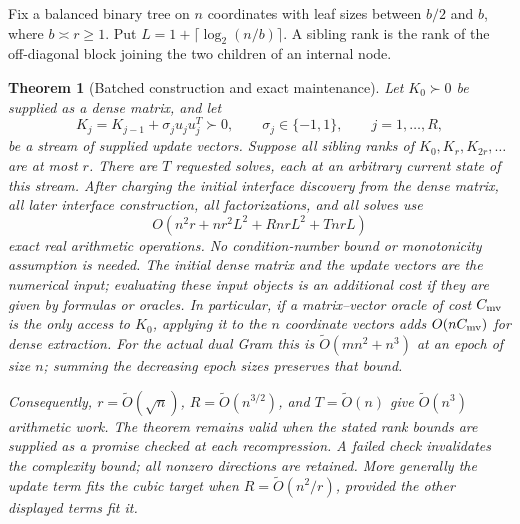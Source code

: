 \documentclass[11pt]{amsart}
\newtheorem{theorem}{Theorem}[section]
\theoremstyle{definition}\newtheorem{definition}[theorem]{Definition}
\theoremstyle{remark}\newtheorem{remark}[theorem]{Remark}
\numberwithin{equation}{section}
\begin{document}
Fix a balanced binary tree on $n$ coordinates with leaf sizes between
$b/2$ and $b$, where $b\asymp r\ge1$.  Put
$L=1+\lceil\log_2(n/b)\rceil$.  A sibling rank is the rank of the
off-diagonal block joining the two children of an internal node.

\begin{theorem}[Batched construction and exact maintenance]
\label{ifc:dyn:thm}
Let $K_0\succ0$ be supplied as a dense matrix, and let
\[
 K_j=K_{j-1}+\sigma_j u_ju_j^T\succ0,
 \qquad \sigma_j\in\{-1,1\},\qquad j=1,\ldots,R,
\]
be a stream of supplied update vectors.  Suppose all sibling ranks of
$K_0,K_r,K_{2r},\ldots$ are at most $r$.  There are $T$ requested solves,
each at an arbitrary current state of this stream.  After charging the
initial interface discovery from the dense matrix, all later interface
construction, all factorizations, and all solves use
\begin{equation}\label{ifc:dyn:cost}
 O\!\left(n^2r+nr^2L^2+RnrL^2+TnrL\right)
\end{equation}
exact real arithmetic operations.  No condition-number bound or
monotonicity assumption is needed.  The initial dense matrix and the
update vectors are the numerical input; evaluating these input objects
is an additional cost if they are given by formulas or oracles.
In particular, if a matrix--vector oracle of cost $C_{\rm mv}$ is the
only access to $K_0$, applying it to the $n$ coordinate vectors adds
$O(nC_{\rm mv})$ for dense extraction.  For the actual dual Gram this
is $\widetilde O(mn^2+n^3)$ at an epoch of size $n$; summing the
decreasing epoch sizes preserves that bound.

Consequently, $r=\widetilde O(\sqrt n)$,
$R=\widetilde O(n^{3/2})$, and $T=\widetilde O(n)$ give
$\widetilde O(n^3)$ arithmetic work.  The theorem remains valid when
the stated rank bounds are supplied as a promise checked at each
recompression.  A failed check invalidates the complexity bound; all nonzero directions
are retained.
More generally the update term fits the cubic target when
$R=\widetilde O(n^2/r)$, provided the other displayed terms fit it.
\end{theorem}
\end{document}
